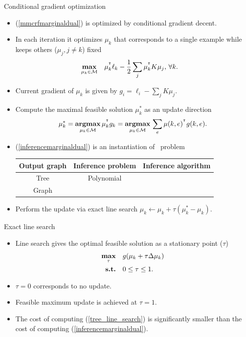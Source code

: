 \documentclass[first=dgreen,second=purple,logo=red]{aaltoslides}
\begin{document}
%
\begin{frame}{Conditional gradient optimization}
	\begin{itemize}\footnotesize
		\item (\ref{mmcrfmarginaldual}) is optimized by conditional gradient decent.
		\item In each iteration it optimizes $\mu_k$ that corresponds to a single example while keeps others ($\mu_j,j\neq k$) fixed 
		\begin{align*}
			\underset{\mathbf {\mu}_k\in\mathcal{M}}{\textbf{max}} & \quad \mathbf {\mu}_k^{^{\intercal}}\ell_k - \frac{1}{2}\sum_{j}\mathbf {\mu}_k^{^{\intercal}}K\mathbf {\mu}_j, \, \forall k.
		\end{align*}
		\item Current gradient of $\mu_k$ is given by $g_i = \ell_{i}-\sum_{j}K\mu_j$.
		\item Compute the maximal feasible solution $\mu_k^*$ as an update direction
		\begin{align}
			\mu_k^* = \underset{\mu_k\in\mathcal{M}}{\textbf{argmax}} \, \mu_k^{^{\intercal}}g_k = \underset{\mu_k\in\mathcal{M}}{\textbf{argmax}} \, \sum_e\mu(k,e)^{^{\intercal}}g(k,e). \label{inferencemarginaldual}
		\end{align}
		\item (\ref{inferencemarginaldual}) is an instantiation of \map\ problem 
		\begin{tabular}{|c|c|c|}
			\hline
			\footnotesize
			 Output graph & Inference problem & Inference algorithm \\ \hline
			 Tree & Polynomial & \dpg\ \cite{Rousu07}  \\
			 Graph & \nphard & \lbp\ \cite{su10structured}  \\ \hline
		\end{tabular}
		\item Perform the update via exact line search $\mu_k \leftarrow \mu_k + \tau(\mu_k^*-\mu_k)$.
	\end{itemize}
\end{frame}

%
\begin{frame}{Exact line search}
	\begin{itemize}
		\item Line search gives the optimal feasible solution as a stationary point ($\tau$)
		\begin{align}
			\underset{\tau}{\textbf{max}} &\quad g(\mathbf {\mu}_k + \tau\Delta\mathbf {\mu}_{k})\label{tree_line_search}\\
			\textbf{s.t.} &\quad 0\le\tau\le1.\nonumber
		\end{align}
		\item $\tau=0$ corresponds to no update.
		\item Feasible maximum update is achieved at $\tau=1$. 
		\item The cost of computing (\ref{tree_line_search}) is significantly smaller than the cost of computing (\ref{inferencemarginaldual}).
	\end{itemize}
\end{frame}
\end{document}
